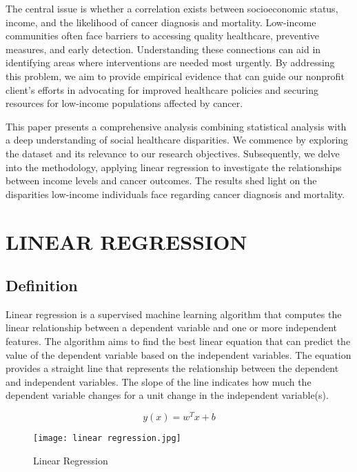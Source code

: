 \documentclass[conference]{IEEEtran}
\begin{document}
The central issue is whether a correlation exists between socioeconomic status, income, and the likelihood of cancer diagnosis and mortality. Low-income communities often face barriers to accessing quality healthcare, preventive measures, and early detection. Understanding these connections can aid in identifying areas where interventions are needed most urgently. By addressing this problem, we aim to provide empirical evidence that can guide our nonprofit client’s efforts in advocating for improved healthcare policies and securing resources for low-income populations affected by cancer.

This paper presents a comprehensive analysis combining statistical analysis with a deep understanding of social healthcare disparities. We commence by exploring the dataset and its relevance to our research objectives. Subsequently, we delve into the methodology, applying linear regression to investigate the relationships between income levels and cancer outcomes. The results shed light on the disparities low-income individuals face regarding cancer diagnosis and mortality. 

\vspace{1mm} %

\section{LINEAR REGRESSION}

\subsection{Definition}
Linear regression is a supervised machine learning algorithm that computes the linear relationship between a dependent variable and one or more independent features. The algorithm aims to find the best linear equation that can predict the value of the dependent variable based on the independent variables. The equation provides a straight line that represents the relationship between the dependent and independent variables. The slope of the line indicates how much the dependent variable changes for a unit change in the independent variable(s).

\begin{equation}
y(x) = w^Tx + b
\end{equation}

\begin{figure}[htbp]
\centerline{\texttt{[image: linear regression.jpg]}}
\caption{Linear Regression}
\label{fig}
\end{figure}
\end{document}
